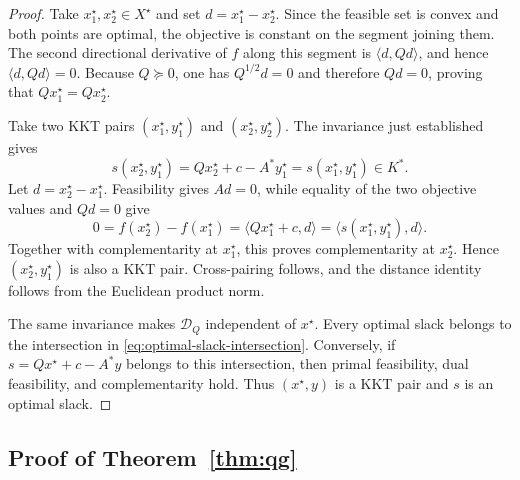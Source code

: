 \documentclass[letterpaper]{article} %
\theoremstyle{definition}
\theoremstyle{remark}
\begin{document}
\begin{proof}
Take $x_1^\star,x_2^\star\in X^\star$ and set
$d=x_1^\star-x_2^\star$.  Since the feasible set is convex and both
points are optimal, the objective is constant on the segment joining them.
The second directional derivative of $f$ along this segment is
$\langle d,Qd\rangle$, and hence $\langle d,Qd\rangle=0$.  Because
$Q\succeq0$, one has $Q^{1/2}d=0$ and therefore $Qd=0$, proving
that $Qx_1^\star=Qx_2^\star$.

Take two KKT pairs $(x_1^\star,y_1^\star)$ and
$(x_2^\star,y_2^\star)$.  The invariance just established gives
\[
    s(x_2^\star,y_1^\star)
    =
    Qx_2^\star+c-A^*y_1^\star
    =
    s(x_1^\star,y_1^\star)\in K^*.
\]
Let $d=x_2^\star-x_1^\star$.  Feasibility gives $Ad=0$, while equality of
the two objective values and $Qd=0$ give
\[
    0 = f(x_2^\star)-f(x_1^\star)= \langle Qx_1^\star+c,d\rangle = \langle s(x_1^\star,y_1^\star),d\rangle .
\]
Together with complementarity at $x_1^\star$, this proves complementarity
at $x_2^\star$.  Hence $(x_2^\star,y_1^\star)$ is also a KKT pair.
Cross-pairing follows, and the distance identity follows from the Euclidean
product norm.

The same invariance makes $\mathcal D_Q$ independent of
$x^\star$.  Every optimal slack belongs to the intersection in
\eqref{eq:optimal-slack-intersection}.  Conversely, if
$s=Qx^\star+c-A^*y$ belongs to this intersection, then primal feasibility,
dual feasibility, and complementarity hold.  Thus $(x^\star,y)$ is a KKT
pair and $s$ is an optimal slack.
\end{proof}

\subsection{Proof of Theorem~\ref{thm:qg}}
\label{app:proof-qg}
\end{document}
